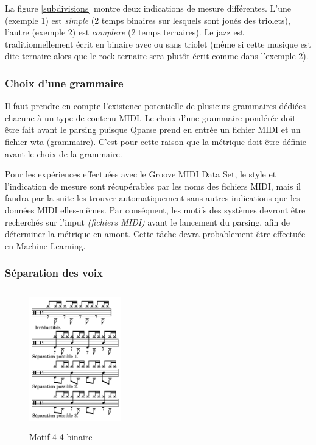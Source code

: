 La figure \ref{subdivisions} montre deux indications de mesure différentes. 
L’une (exemple 1) est \textit{simple} (2 temps binaires sur lesquels sont joués des triolets), 
l’autre (exemple 2) est \textit{complexe} (2 temps ternaires). 
Le jazz est traditionnellement écrit en binaire avec ou sans triolet (même si cette musique est dite ternaire alors que le rock ternaire sera plutôt écrit comme dans l’exemple 2).

\subsubsection{Choix d’une grammaire}
Il faut prendre en compte l’existence potentielle de plusieurs grammaires dédiées chacune à un type de contenu MIDI. 
Le choix d’une grammaire pondérée doit être fait avant le parsing puisque Qparse prend en entrée un fichier MIDI et un fichier wta (grammaire). C’est pour cette raison que la métrique doit être définie avant le choix de la grammaire.

Pour les expériences effectuées avec le Groove MIDI Data Set, 
le style et l’indication de mesure sont récupérables par les noms des fichiers MIDI, 
mais il faudra par la suite les trouver automatiquement sans autres indications 
que les données  MIDI elles-mêmes. 
Par conséquent, les motifs des systèmes devront être recherchés sur l’input \textit{(fichiers MIDI)} 
avant le lancement du parsing, afin de déterminer la métrique en amont. 
Cette tâche devra probablement être effectuée en Machine Learning. %


\subsubsection{Séparation des voix}
\label{sys_sep_voix}
\begin{figure}[h]
	\centering
	\includegraphics[height=60mm, width=40mm]{z_images/3_methodes/2_systemes/1_separation_4-4_binaire.png}
	\caption{Motif 4-4 binaire}
	\label{binaire}
\end{figure}


